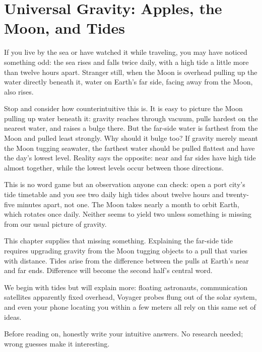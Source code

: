 \chapter{Universal Gravity: Apples, the Moon, and Tides}


If you live by the sea or have watched it while traveling, you may have noticed something odd: the sea rises and falls twice daily, with a high tide a little more than twelve hours apart. Stranger still, when the Moon is overhead pulling up the water directly beneath it, water on Earth's far side, facing away from the Moon, also rises.

Stop and consider how counterintuitive this is. It is easy to picture the Moon pulling up water beneath it: gravity reaches through vacuum, pulls hardest on the nearest water, and raises a bulge there. But the far-side water is farthest from the Moon and pulled least strongly. Why should it bulge too? If gravity merely meant the Moon tugging seawater, the farthest water should be pulled flattest and have the day's lowest level. Reality says the opposite: near and far sides have high tide almost together, while the lowest levels occur between those directions.

This is no word game but an observation anyone can check: open a port city's tide timetable and you see two daily high tides about twelve hours and twenty-five minutes apart, not one. The Moon takes nearly a month to orbit Earth, which rotates once daily. Neither seems to yield two unless something is missing from our usual picture of gravity.

This chapter supplies that missing something. Explaining the far-side tide requires upgrading gravity from the Moon tugging objects to a pull that varies with distance. Tides arise from the difference between the pulls at Earth's near and far ends. Difference will become the second half's central word.

We begin with tides but will explain more: floating astronauts, communication satellites apparently fixed overhead, Voyager probes flung out of the solar system, and even your phone locating you within a few meters all rely on this same set of ideas.


Before reading on, honestly write your intuitive answers. No research needed; wrong guesses make it interesting.

